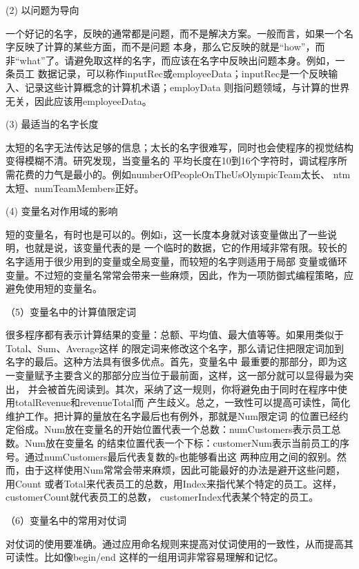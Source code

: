 \documentclass{article}
\begin{document}
\par
(2) 以问题为导向
\par
一个好记的名字，反映的通常都是问题，而不是解决方案。一般而言，如果一个名字反映了计算的某些方面，而不是问题
本身，那么它反映的就是“how”，而非“what”了。请避免取这样的名字，而应该在名字中反映出问题本身。例如，一条员工
数据记录，可以称作inputRec或employeeData；inputRec是一个反映输入、记录这些计算概念的计算机术语；employData
则指问题领域，与计算的世界无关，因此应该用employeeData。

\par
(3) 最适当的名字长度
\par
太短的名字无法传达足够的信息；太长的名字很难写，同时也会使程序的视觉结构变得模糊不清。研究发现，当变量名的
平均长度在10到16个字符时，调试程序所需花费的力气是最小的。例如numberOfPeopleOnTheUsOlympicTeam太长、
ntm太短、numTeamMembers正好。

\par
(4) 变量名对作用域的影响
\par
短的变量名，有时也是可以的。例如i，这一长度本身就对该变量做出了一些说明，也就是说，该变量代表的是
一个临时的数据，它的作用域非常有限。较长的名字适用于很少用到的变量或全局变量，而较短的名字则适用于局部
变量或循环变量。不过短的变量名常常会带来一些麻烦，因此，作为一项防御式编程策略，应避免使用短的变量名。

\par
（5）变量名中的计算值限定词
\par
很多程序都有表示计算结果的变量：总额、平均值、最大值等等。如果用类似于Total、Sum、Average这样
的限定词来修改这个名字，那么请记住把限定词加到名字的最后。这种方法具有很多优点。首先，变量名中
最重要的那部分，即为这一变量赋予主要含义的那部分应当位于最前面，这样，这一部分就可以显得最为突出，
并会被首先阅读到。其次，采纳了这一规则，你将避免由于同时在程序中使用totalRevenue和revenueTotal而
产生歧义。总之，一致性可以提高可读性，简化维护工作。把计算的量放在名字最后也有例外，那就是Num限定词
的位置已经约定俗成。Num放在变量名的开始位置代表一个总数：numCustomers表示员工总数。Num放在变量名
的结束位置代表一个下标：customerNum表示当前员工的序号。通过numCustomers最后代表复数的s也能够看出这
两种应用之间的叙别。然而，由于这样使用Num常常会带来麻烦，因此可能最好的办法是避开这些问题，用Count
或者Total来代表员工的总数，用Index来指代某个特定的员工。这样，customerCount就代表员工的总数，
customerIndex代表某个特定的员工。

\par
（6）变量名中的常用对仗词
\par
对仗词的使用要准确。通过应用命名规则来提高对仗词使用的一致性，从而提高其可读性。比如像begin/end
这样的一组用词非常容易理解和记忆。
\end{document}
